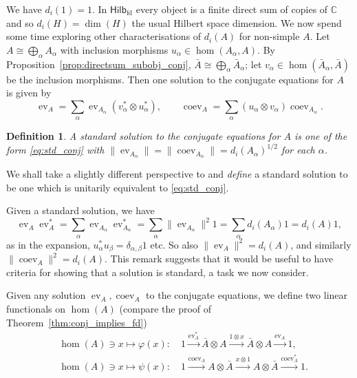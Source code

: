 \documentclass[a4paper,11pt]{article}
\theoremstyle{plain}
\newtheorem{definition}[proposition]{Definition}
\theoremstyle{remark}
\newcommand{\catHilbFD}{\textsf{Hilb}_{\text{fd}}}
\newcommand{\ev}{\operatorname{ev}}
\newcommand{\coev}{\operatorname{coev}}
\newcommand{\conj}[1]{\bar{#1}}
\begin{document}
We have $d_i(1)=1$.  In $\catHilbFD$ every object is a finite direct sum of copies of $\mathbb C$ and so $d_i(H) = \dim(H)$ the usual Hilbert space dimension.  We now spend some time exploring other characterisations of $d_i(A)$ for non-simple $A$.  Let $A \cong \bigoplus_\alpha A_\alpha$ with inclusion morphisms $u_\alpha \in \hom(A_\alpha, A)$.  By Proposition~\ref{prop:directsum_subobj_conj}, $\conj A \cong \bigoplus_\alpha \conj A_\alpha$; let $v_\alpha \in \hom(\conj A_\alpha, \conj A)$ be the inclusion morphisms.  Then one solution to the conjugate equations for $A$ is given by
\begin{equation}
  \label{eq:std_conj}
  \ev_A = \sum_\alpha \ev_{A_\alpha}(v_\alpha^*\otimes u_\alpha^*), \qquad
  \coev_A = \sum_\alpha (u_\alpha\otimes v_\alpha) \coev_{A_\alpha}.
\end{equation}

\begin{definition}
A \emph{standard} solution to the conjugate equations for $A$ is one of the form \eqref{eq:std_conj} with $\|\ev_{A_\alpha}\| = \|\coev_{A_\alpha}\| = d_i(A_\alpha)^{1/2}$ for each $\alpha$.
\end{definition}

We shall take a slightly different perspective to \cite{NT_CQGsBook} and \emph{define} a standard solution to be one which is unitarily equivalent to \eqref{eq:std_conj}.

Given a standard solution, we have
\[ \ev_A \ev_A^* = \sum_\alpha \ev_{A_\alpha} \ev_{A_\alpha}^* = \sum_\alpha \|\ev_{A_\alpha}\|^2 1 = \sum_\alpha d_i(A_\alpha) 1 = d_i(A) 1, \]
as in the expansion, $u_\alpha^* u_\beta = \delta_{\alpha,\beta}1$ etc.  So also $\|\ev_A\|^2 = d_i(A)$, and similarly $\| \coev_A \|^2 = d_i(A)$.  This remark suggests that it would be useful to have criteria for showing that a solution is standard, a task we now consider.

Given any solution $\ev_A, \coev_A$ to the conjugate equations, we define two linear functionals on $\hom(A)$ (compare the proof of Theorem~\ref{thm:conj_implies_fd})
\begin{align*}
&\hom(A) \ni x \mapsto \varphi(x) : \quad
1 \xrightarrow{\ev_A^*} \conj A \otimes A \xrightarrow{1\otimes x} \conj A \otimes A \xrightarrow{\ev_A} 1,
\\
&\hom(A) \ni x \mapsto \psi(x) : \quad
1 \xrightarrow{\coev_A} A \otimes \conj{A} \xrightarrow{x\otimes 1} A \otimes \conj{A} \xrightarrow{\coev_A^*} 1.
\end{align*}
\end{document}
